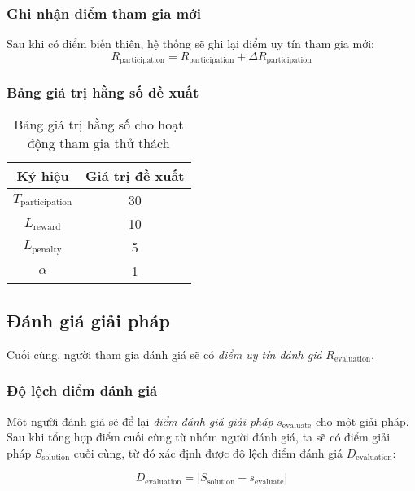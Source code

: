 \subsubsection{Ghi nhận điểm tham gia mới}

Sau khi có điểm biến thiên, hệ thống sẽ ghi lại điểm uy tín tham gia mới:
\[R_{\text{participation}} = R_{\text{participation}} + \Delta R_{\text{participation}}\]

\subsubsection{Bảng giá trị hằng số đề xuất}

\begin{table}[H]
  \centering
  \small
  \begin{tabular}{|c|c|}
    \hline
    \textbf{Ký hiệu}           & \textbf{Giá trị đề xuất} \\ \hline
    $T_{\text{participation}}$ & 30                       \\ \hline
    $L_{\text{reward}}$        & 10                       \\ \hline
    $L_{\text{penalty}}$       & 5                        \\ \hline
    $\alpha$                   & 1                        \\ \hline
  \end{tabular}
  \caption{Bảng giá trị hằng số cho hoạt động tham gia thử thách}
  \label{tab:suggested-constant-values-for-participation}
\end{table}

\subsection{Đánh giá giải pháp}

Cuối cùng, người tham gia đánh giá sẽ có \textit{điểm uy tín đánh giá} $R_{\text{evaluation}}$.

\subsubsection{Độ lệch điểm đánh giá}

Một người đánh giá sẽ để lại \textit{điểm đánh giá giải pháp} $s_{\text{evaluate}}$ cho một giải pháp. Sau khi tổng hợp điểm cuối cùng từ nhóm người đánh giá,
ta sẽ có điểm giải pháp $S_{\text{solution}}$ cuối cùng, từ đó xác định được độ lệch điểm đánh giá $D_{\text{evaluation}}$:

\[D_{\text{evaluation}}=|S_{\text{solution}}-s_{\text{evaluate}}|\]

